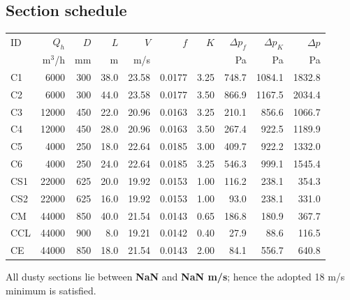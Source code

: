 \documentclass[11pt,a4paper]{article}
\begin{document}
\subsection{Section schedule}
\begin{center}\scriptsize
\begin{tabular}{lrrrrrrrrr}
\toprule
ID & $Q_h$ & $D$ & $L$ & $V$ & $f$ & $K$ & $\Delta p_f$ & $\Delta p_K$ & $\Delta p$\\
 & m$^3$/h & mm & m & m/s & & & Pa & Pa & Pa\\
\midrule
C1 & 6000 & 300 & 38.0 & 23.58 & 0.0177 & 3.25 & 748.7 & 1084.1 & 1832.8 \\
C2 & 6000 & 300 & 44.0 & 23.58 & 0.0177 & 3.50 & 866.9 & 1167.5 & 2034.4 \\
C3 & 12000 & 450 & 22.0 & 20.96 & 0.0163 & 3.25 & 210.1 & 856.6 & 1066.7 \\
C4 & 12000 & 450 & 28.0 & 20.96 & 0.0163 & 3.50 & 267.4 & 922.5 & 1189.9 \\
C5 & 4000 & 250 & 18.0 & 22.64 & 0.0185 & 3.00 & 409.7 & 922.2 & 1332.0 \\
C6 & 4000 & 250 & 24.0 & 22.64 & 0.0185 & 3.25 & 546.3 & 999.1 & 1545.4 \\
CS1 & 22000 & 625 & 20.0 & 19.92 & 0.0153 & 1.00 & 116.2 & 238.1 & 354.3 \\
CS2 & 22000 & 625 & 16.0 & 19.92 & 0.0153 & 1.00 & 93.0 & 238.1 & 331.0 \\
CM & 44000 & 850 & 40.0 & 21.54 & 0.0143 & 0.65 & 186.8 & 180.9 & 367.7 \\
CCL & 44000 & 900 & 8.0 & 19.21 & 0.0142 & 0.40 & 27.9 & 88.6 & 116.5 \\
CE & 44000 & 850 & 18.0 & 21.54 & 0.0143 & 2.00 & 84.1 & 556.7 & 640.8 \\
\bottomrule
\end{tabular}
\end{center}
All dusty sections lie between \textbf{NaN} and \textbf{NaN m/s}; hence the adopted 18 m/s minimum is satisfied.

\clearpage
\end{document}
